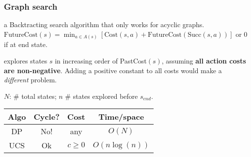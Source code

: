 \subsubsection{Graph search}

 a Backtracting search algorithm that only works
for acyclic graphs.
$\text{FutureCost}(s) = \min_{a\in A(s)}\left[\text{Cost}(s,a) + \text{FutureCost}(\text{Succ}(s,a))\right]$
or $0$ if at end state.

 explores states $s$ in increasing order of
PastCost$(s)$, assuming \textbf{all action costs are non-negative}. Adding a
positive constant to all costs would make a \emph{different} problem.

 $N$: \# total states; $n$ \# states explored before $s_{end}$.

\begin{tabular}{|c|c|c|c|} 
    \hline
    \textbf{Algo} & \textbf{Cycle?} & \textbf{Cost} & \textbf{Time/space} \\
    \hline
    DP & No! & any & $O(N)$ \\ 
    \hline
    UCS & Ok & $c \ge 0$ & $O(n \log(n))$ \\
    \hline
\end{tabular}